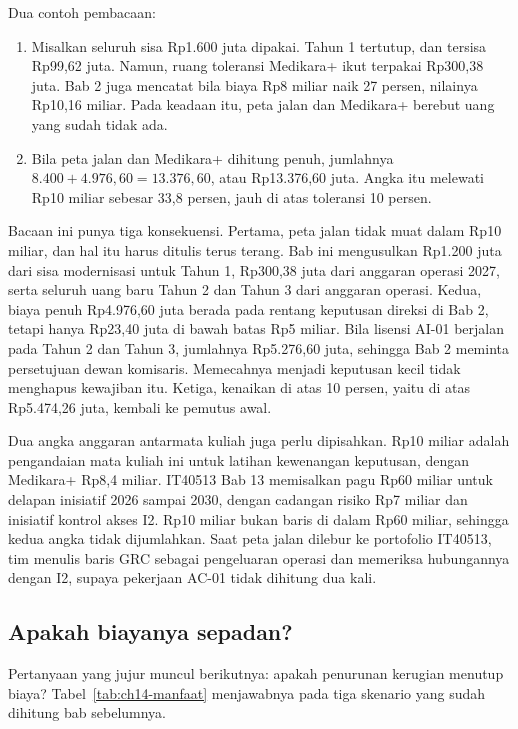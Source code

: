 Dua contoh pembacaan:
\begin{enumerate}
  \item Misalkan seluruh sisa Rp1.600 juta dipakai. Tahun 1 tertutup, dan tersisa Rp99,62 juta.
  Namun, ruang toleransi Medikara+ ikut terpakai Rp300,38 juta. Bab 2 juga mencatat bila biaya Rp8
  miliar naik 27 persen, nilainya Rp10,16 miliar. Pada keadaan itu, peta jalan dan Medikara+
  berebut uang yang sudah tidak ada.
  \item Bila peta jalan dan Medikara+ dihitung penuh, jumlahnya $8.400 + 4.976{,}60 =
  13.376{,}60$, atau Rp13.376,60 juta. Angka itu melewati Rp10 miliar sebesar 33,8 persen, jauh di
  atas toleransi 10 persen.
\end{enumerate}

Bacaan ini punya tiga konsekuensi. Pertama, peta jalan tidak muat dalam Rp10 miliar, dan hal itu
harus ditulis terus terang. Bab ini mengusulkan Rp1.200 juta dari sisa modernisasi untuk Tahun 1,
Rp300,38 juta dari anggaran operasi 2027, serta seluruh uang baru Tahun 2 dan Tahun 3 dari
anggaran operasi. Kedua, biaya penuh Rp4.976,60 juta berada pada rentang keputusan direksi di Bab
2, tetapi hanya Rp23,40 juta di bawah batas Rp5 miliar. Bila lisensi AI-01 berjalan pada Tahun 2
dan Tahun 3, jumlahnya Rp5.276,60 juta, sehingga Bab 2 meminta persetujuan dewan komisaris.
Memecahnya menjadi keputusan kecil tidak menghapus kewajiban itu. Ketiga, kenaikan di atas 10
persen, yaitu di atas Rp5.474,26 juta, kembali ke pemutus awal.

Dua angka anggaran antarmata kuliah juga perlu dipisahkan. Rp10 miliar adalah pengandaian mata
kuliah ini untuk latihan kewenangan keputusan, dengan Medikara+ Rp8,4 miliar. IT40513 Bab 13
memisalkan pagu Rp60 miliar untuk delapan inisiatif 2026 sampai 2030, dengan cadangan risiko Rp7
miliar dan inisiatif kontrol akses I2. Rp10 miliar bukan baris di dalam Rp60 miliar, sehingga kedua
angka tidak dijumlahkan.
Saat peta jalan dilebur ke portofolio IT40513, tim menulis baris GRC sebagai pengeluaran operasi
dan memeriksa hubungannya dengan I2, supaya pekerjaan AC-01 tidak dihitung dua kali.

\subsection*{Apakah biayanya sepadan?}

Pertanyaan yang jujur muncul berikutnya: apakah penurunan kerugian menutup biaya?
Tabel~\ref{tab:ch14-manfaat} menjawabnya pada tiga skenario yang sudah dihitung bab sebelumnya.


